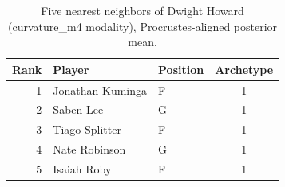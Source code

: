 \begin{table}[htbp]
  \centering\small
  \begin{tabular}{rllc}
    \toprule
    Rank & Player & Position & Archetype \\
    \midrule
    1 & Jonathan Kuminga & F & 1 \\
    2 & Saben Lee & G & 1 \\
    3 & Tiago Splitter & F & 1 \\
    4 & Nate Robinson & G & 1 \\
    5 & Isaiah Roby & F & 1 \\
    \bottomrule
  \end{tabular}
  \caption{Five nearest neighbors of Dwight Howard (curvature_m4 modality), Procrustes-aligned posterior mean.}
  \label{tab:Dwight_Howard_neighbors_curvature_m4}
\end{table}

